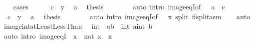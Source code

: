 \begin{isabellebody}
\ \ \isamarkupfalse%
\ cases\isanewline
\ \ \ \ \isamarkupfalse%
\ {\isachardoublequoteopen}c\ {\isacharless}{\kern0pt}\ y{\isachardoublequoteclose}\ \isamarkupfalse%
\ a\ \isamarkupfalse%
\ {\isacharquery}{\kern0pt}thesis\isanewline
\ \ \ \ \ \ \isamarkupfalse%
\ {\isacharparenleft}{\kern0pt}auto\ intro{\isacharbang}{\kern0pt}{\isacharcolon}{\kern0pt}\ image{\isacharunderscore}{\kern0pt}eqI{\isacharbrackleft}{\kern0pt}of\ {\isacharunderscore}{\kern0pt}\ {\isacharunderscore}{\kern0pt}\ {\isachardoublequoteopen}a\ {\isacharplus}{\kern0pt}\ c{\isachardoublequoteclose}{\isacharbrackright}{\kern0pt}{\isacharparenright}{\kern0pt}\isanewline
\ \ \isamarkupfalse%
\isanewline
\ \ \ \ \isamarkupfalse%
\ {\isachardoublequoteopen}{\isasymnot}\ c\ {\isacharless}{\kern0pt}\ y{\isachardoublequoteclose}\ \isamarkupfalse%
\ a\ \isamarkupfalse%
\ {\isacharquery}{\kern0pt}thesis\isanewline
\ \ \ \ \ \ \isamarkupfalse%
\ {\isacharparenleft}{\kern0pt}auto\ intro{\isacharbang}{\kern0pt}{\isacharcolon}{\kern0pt}\ image{\isacharunderscore}{\kern0pt}eqI{\isacharbrackleft}{\kern0pt}of\ {\isacharunderscore}{\kern0pt}\ {\isacharunderscore}{\kern0pt}\ x{\isacharbrackright}{\kern0pt}\ split{\isacharcolon}{\kern0pt}\ if{\isacharunderscore}{\kern0pt}split{\isacharunderscore}{\kern0pt}asm{\isacharparenright}{\kern0pt}\isanewline
\ \ \isamarkupfalse%
\isanewline
{}\isamarkupfalse%
\ auto%
\endisatagproof
{\isafoldproof}%
%
\isadelimproof
\isanewline
%
\endisadelimproof
\isanewline
{}\isamarkupfalse%
\ image{\isacharunderscore}{\kern0pt}int{\isacharunderscore}{\kern0pt}atLeastLessThan{\isacharcolon}{\kern0pt}\isanewline
\ \ {\isachardoublequoteopen}int\ {\isacharbackquote}{\kern0pt}\ {\isacharbraceleft}{\kern0pt}a{\isachardot}{\kern0pt}{\isachardot}{\kern0pt}{\isacharless}{\kern0pt}b{\isacharbraceright}{\kern0pt}\ {\isacharequal}{\kern0pt}\ {\isacharbraceleft}{\kern0pt}int\ a{\isachardot}{\kern0pt}{\isachardot}{\kern0pt}{\isacharless}{\kern0pt}int\ b{\isacharbraceright}{\kern0pt}{\isachardoublequoteclose}\isanewline
%
\isadelimproof
\ \ %
\endisadelimproof
%
\isatagproof
{}\isamarkupfalse%
\ {\isacharparenleft}{\kern0pt}auto\ intro{\isacharbang}{\kern0pt}{\isacharcolon}{\kern0pt}\ image{\isacharunderscore}{\kern0pt}eqI\ {\isacharbrackleft}{\kern0pt}\ x\ {\isacharequal}{\kern0pt}\ {\isachardoublequoteopen}nat\ x{\isachardoublequoteclose}\ \ x{\isacharbrackright}{\kern0pt}{\isacharparenright}{\kern0pt}%

\end{isabellebody}
